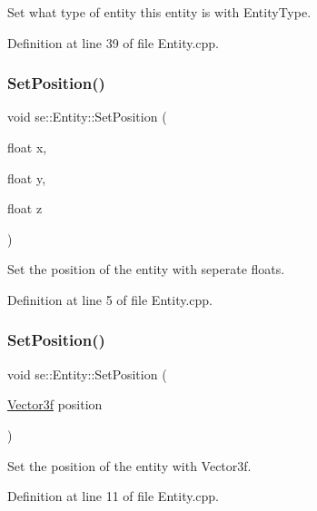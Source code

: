 Set what type of entity this entity is with Entity\+Type. 

Definition at line 39 of file Entity.\+cpp.

\mbox{\label{classse_1_1_entity_a09e198e70620f231106d9f375f7598f3}} 
\subsubsection{\texorpdfstring{Set\+Position()}{SetPosition()}\hspace{0.1cm}{\footnotesize\ttfamily [1/2]}}
{\footnotesize\ttfamily void se\+::\+Entity\+::\+Set\+Position (\begin{DoxyParamCaption}\item[{float}]{x,  }\item[{float}]{y,  }\item[{float}]{z }\end{DoxyParamCaption})\hspace{0.3cm}{\ttfamily [virtual]}}

Set the position of the entity with seperate floats. 

Definition at line 5 of file Entity.\+cpp.

\mbox{\label{classse_1_1_entity_ae0d37a4774afab2b7abf4118efc57499}} 
\subsubsection{\texorpdfstring{Set\+Position()}{SetPosition()}\hspace{0.1cm}{\footnotesize\ttfamily [2/2]}}
{\footnotesize\ttfamily void se\+::\+Entity\+::\+Set\+Position (\begin{DoxyParamCaption}\item[{\mbox{\hyperlink{namespacese_a12e07512d95e2fdebdaf74a5ea2cf5f6}{Vector3f}}}]{position }\end{DoxyParamCaption})\hspace{0.3cm}{\ttfamily [virtual]}}

Set the position of the entity with Vector3f. 

Definition at line 11 of file Entity.\+cpp.


